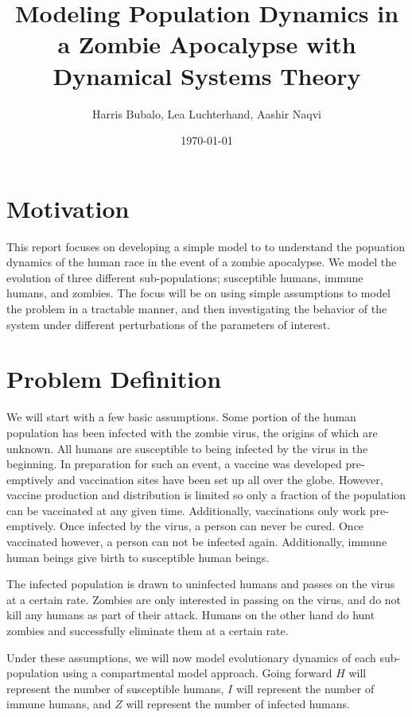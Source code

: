 \documentclass[
	12pt
]{article}
\title{Modeling Population Dynamics in a Zombie Apocalypse with Dynamical Systems Theory} %
\date{\today}
\author{Harris Bubalo, Lea Luchterhand, Aashir Naqvi}
\begin{document}
\maketitle
\pagebreak
\tableofcontents
\pagebreak
\section{Motivation}
This report focuses on developing a simple model to to understand the popuation dynamics of the human race in the event of a zombie apocalypse. We model the evolution of three different sub-populations; susceptible humans, immune humans, and zombies. The focus will be on using simple assumptions to model the problem in a tractable manner, and then investigating the behavior of the system under different perturbations of the parameters of interest.
\section{Problem Definition}
We will start with a few basic assumptions. Some portion of the human population has been infected with the zombie virus, the origins of which are unknown. All humans are susceptible to being infected by the virus in the beginning. In preparation for such an event, a vaccine was developed pre-emptively and vaccination sites have been set up all over the globe. However, vaccine production and distribution is limited so only a fraction of the population can be vaccinated at any given time. Additionally, vaccinations only work pre-emptively. Once infected by the virus, a person can never be cured. Once vaccinated however, a person can not be infected again. Additionally, immune human beings give birth to susceptible human beings.

The infected population is drawn to uninfected humans and passes on the virus at a certain rate. Zombies are only interested in passing on the virus, and do not kill any humans as part of their attack. Humans on the other hand do hunt zombies and successfully eliminate them at a certain rate. 

Under these assumptions, we will now model evolutionary dynamics of each sub-population using a compartmental model approach. Going forward $H$ will represent the number of susceptible humans, $I$ will represent the number of immune humans, and $Z$ will represent the number of infected humans.
\end{document}
